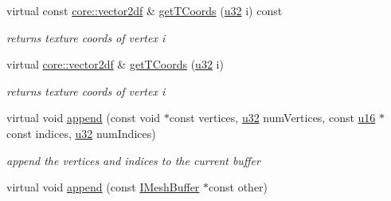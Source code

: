 \begin{DoxyCompactItemize}
\mbox{\label{structirr_1_1scene_1_1SSkinMeshBuffer_a95a35014fd0c9c18de65e1ff2e09b89b}} 
virtual const \hyperlink{namespaceirr_1_1core_a2cf08556d77f6f5a792973a6e27ed11b}{core\+::vector2df} \& \hyperlink{structirr_1_1scene_1_1SSkinMeshBuffer_a95a35014fd0c9c18de65e1ff2e09b89b}{get\+T\+Coords} (\hyperlink{namespaceirr_a0416a53257075833e7002efd0a18e804}{u32} i) const
\begin{DoxyCompactList}\small\item\em returns texture coords of vertex i \end{DoxyCompactList}\item 
\mbox{\label{structirr_1_1scene_1_1SSkinMeshBuffer_ac2995b2452443d6bcad0a940e8218c3e}} 
virtual \hyperlink{namespaceirr_1_1core_a2cf08556d77f6f5a792973a6e27ed11b}{core\+::vector2df} \& \hyperlink{structirr_1_1scene_1_1SSkinMeshBuffer_ac2995b2452443d6bcad0a940e8218c3e}{get\+T\+Coords} (\hyperlink{namespaceirr_a0416a53257075833e7002efd0a18e804}{u32} i)
\begin{DoxyCompactList}\small\item\em returns texture coords of vertex i \end{DoxyCompactList}\item 
\mbox{\label{structirr_1_1scene_1_1SSkinMeshBuffer_aded60392b4d793804bbf417c6bafa5f9}} 
virtual void \hyperlink{structirr_1_1scene_1_1SSkinMeshBuffer_aded60392b4d793804bbf417c6bafa5f9}{append} (const void $\ast$const vertices, \hyperlink{namespaceirr_a0416a53257075833e7002efd0a18e804}{u32} num\+Vertices, const \hyperlink{namespaceirr_ae9f8ec82692ad3b83c21f555bfa70bcc}{u16} $\ast$const indices, \hyperlink{namespaceirr_a0416a53257075833e7002efd0a18e804}{u32} num\+Indices)
\begin{DoxyCompactList}\small\item\em append the vertices and indices to the current buffer \end{DoxyCompactList}\item 
\mbox{\label{structirr_1_1scene_1_1SSkinMeshBuffer_a5395bc06c4c6b1c9a82dbdd56916a9e0}} 
virtual void \hyperlink{structirr_1_1scene_1_1SSkinMeshBuffer_a5395bc06c4c6b1c9a82dbdd56916a9e0}{append} (const \hyperlink{classirr_1_1scene_1_1IMeshBuffer}{I\+Mesh\+Buffer} $\ast$const other)

\end{DoxyCompactItemize}
